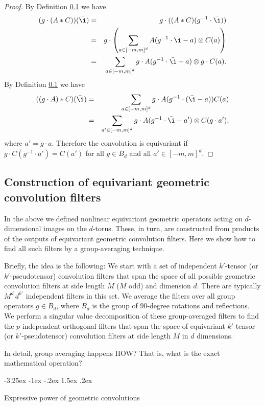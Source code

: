 \documentclass{article}
\makeatletter
\theoremstyle{plain}
\renewcommand\section{\@startsection {section}{1}{\z@}%
  {-3.25ex \@plus -1ex \@minus -.2ex}%
  {1.5ex \@plus .2ex}%
  {\raggedright\normalfont\large\bfseries}}
\makeatother
\begin{document}
\begin{proof}
By Definition \ref{} we have
\begin{eqnarray}
(g\cdot (A* C) )(\bar \i) &=& g\cdot( (A*C)(g^{-1} \cdot \bar \i)) \\
&=& g \cdot \left (\sum_{a\in [-m,m]^d} A(g^{-1}\cdot \bar \i - a) \otimes C(a)\right)\\
&=& \sum_{a\in [-m,m]^d} g \cdot A(g^{-1} \cdot \bar \i -a ) \otimes g \cdot C(a).
\end{eqnarray}
By Definition \ref{} we have
\begin{eqnarray}
((g\cdot A)* C) (\bar \i) &=& \sum_{a\in [-m,m]^d} g\cdot A(g^{-1} \cdot (\bar \i - a) ) C(a) \\
&=& \sum_{a'\in [-m,m]^d} g \cdot A(g^{-1}\cdot \bar \i -a') \otimes C(g\cdot a'),
\end{eqnarray}
where $a'=g\cdot a$. Therefore the convolution is equivariant if $g\cdot C(g^{-1} \cdot a') = C(a')$ for all $g\in B_d$ and all $a' \in [-m,m]^d$. 
\end{proof}

\subsection{Construction of equivariant geometric convolution filters}
In the above we defined nonlinear equivariant geometric operators acting on $d$-dimensional images on the $d$-torus.
These, in turn, are constructed from products of the outputs of equivariant geometric convolution filters.
Here we show how to find all such filters by a group-averaging technique.

Briefly, the idea is the following:
We start with a set of independent $k'$-tensor (or $k'$-pseudotensor) convolution filters that span the space of all possible geometric convolution filters at side length $M$ ($M$ odd) and dimension $d$.
There are typically $M^d\,d^{k'}$ independent filters in this set.
We average the filters over all group operators $g\in B_d$, where $B_d$ is the group of 90-degree rotations and reflections.
We perform a singular value decomposition of these group-averaged filters to find the $p$ independent orthogonal filters that span the space of equivariant $k'$-tensor (or $k'$-pseudotensor) convolution filters at side length $M$ in $d$ dimensions.

In detail, group averaging happens HOW? That is, what is the exact mathematical operation?

\section{Expressive power of geometric convolutions}\label{sec:universality}
\end{document}
